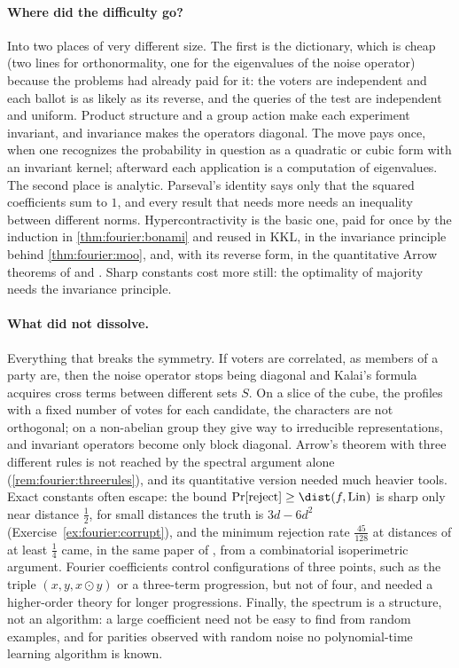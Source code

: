 \begin{refsection}
\paragraph{Where did the difficulty go?}
Into two places of very different size. The first is the dictionary, which is cheap (two lines for orthonormality, one for the eigenvalues of the noise operator) because the problems had already paid for it: the voters are independent and each ballot is as likely as its reverse, and the queries of the test are independent and uniform. Product structure and a group action make each experiment invariant, and invariance makes the operators diagonal. The move pays once, when one recognizes the probability in question as a quadratic or cubic form with an invariant kernel; afterward each application is a computation of eigenvalues. The second place is analytic. Parseval's identity says only that the squared coefficients sum to $1$, and every result that needs more needs an inequality between different norms. Hypercontractivity is the basic one, paid for once by the induction in \cref{thm:fourier:bonami} and reused in KKL, in the invariance principle behind \cref{thm:fourier:moo}, and, with its reverse form, in the quantitative Arrow theorems of \textcite{Mossel2012} and \textcite{Keller2012}. Sharp constants cost more still: the optimality of majority needs the invariance principle.

\paragraph{What did not dissolve.}
Everything that breaks the symmetry. If voters are correlated, as members of a party are, then the noise operator stops being diagonal and Kalai's formula acquires cross terms between different sets $S$. On a slice of the cube, the profiles with a fixed number of votes for each candidate, the characters are not orthogonal; on a non-abelian group they give way to irreducible representations, and invariant operators become only block diagonal. Arrow's theorem with three different rules is not reached by the spectral argument alone (\cref{rem:fourier:threerules}), and its quantitative version needed much heavier tools. Exact constants often escape: the bound $\Pr[\text{reject}]\ge\dist(f,\fourierLin)$ is sharp only near distance $\frac12$, for small distances the truth is $3d-6d^2$ (Exercise~\ref{ex:fourier:corrupt}), and the minimum rejection rate $\frac{45}{128}$ at distances of at least $\frac14$ came, in the same paper of \textcite{BellareEtAl1996}, from a combinatorial isoperimetric argument. Fourier coefficients control configurations of three points, such as the triple $(x,y,x\odot y)$ or a three-term progression, but not of four, and \textcite{Gowers2001} needed a higher-order theory for longer progressions. Finally, the spectrum is a structure, not an algorithm: a large coefficient need not be easy to find from random examples, and for parities observed with random noise no polynomial-time learning algorithm is known.


\end{refsection}
